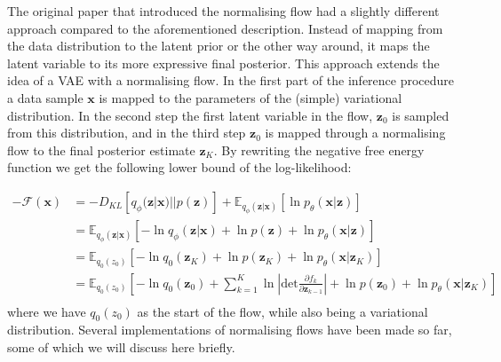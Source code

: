 \documentclass{report}
\newcommand{\E}{\mathbb{E}}
\newcommand{\bx}{\mathbf{x}}
\newcommand{\bz}{\mathbf{z}}
\newcommand{\parfrac}[2]{\frac{\partial #1}{\partial#2}}
\begin{document}
The original paper that introduced the normalising flow had a slightly different approach compared to the aforementioned description. Instead of mapping from the data distribution to the latent prior or the other way around, it maps the latent variable to its more expressive final posterior. This approach extends the idea of a VAE with a normalising flow. In the first part of the inference procedure a data sample $\bx$ is mapped to the parameters of the (simple) variational distribution. In the second step the first latent variable in the flow, $\bz_0$ is sampled from this distribution, and in the third step $\bz_0$ is mapped through a normalising flow to the final posterior estimate $\bz_K$. By rewriting the negative free energy function we get the following lower bound of the log-likelihood:

\begin{equation}\label{equation:negative_free_energy_with_flow}
    \begin{split}
    -\mathcal{F}(\bx) &= -D_{KL}[q_\phi(\bz|\bx) || p(\bz)] + \E_{q_\phi(\bz|\bx)}[\ln p_\theta(\bx|\bz)]\\
    &= \E_{q_\phi(\bz|\bx)}[-\ln q_\phi(\bz|\bx) + \ln p(\bz) + \ln p_\theta(\bx|\bz)]\\
    &= \E_{q_0(z_0)}[-\ln q_0(\bz_K) + \ln p(\bz_K) + \ln p_\theta(\bx|\bz_K)]\\
    &= \E_{q_0(z_0)}[-\ln q_0(\bz_0) + \sum\limits^K_{k=1}\ln \left|\text{det} \parfrac{f_k}{\bz_{k-1}} \right| + \ln p(\bz_0) + \ln p_\theta(\bx|\bz_K)]\\
    \end{split}
\end{equation}
where we have $q_0(z_0)$ as the start of the flow, while also being a variational distribution. Several implementations of normalising flows have been made so far, some of which we will discuss here briefly.
\end{document}
